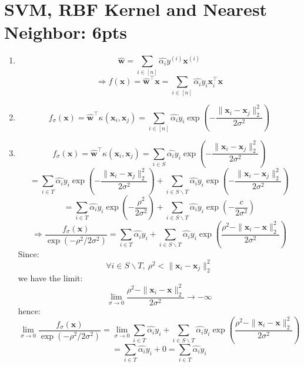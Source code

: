 \documentclass[12pt]{article}
\begin{document}
\section{SVM, RBF Kernel and Nearest Neighbor: 6pts}
\begin{enumerate}
    \item \[\hat{\boldsymbol{w}} = \sum_{i \in [n]} \hat{\alpha_i}y^{(i)}\boldsymbol{x}^{(i)}\]
    \[\Rightarrow f(\boldsymbol{x}) = \hat{\boldsymbol{w}}^{\top}\boldsymbol{x}
    = \sum_{i \in [n]} \hat{\alpha_i}y_i\boldsymbol{x}_i^{\top}\boldsymbol{x}\]
    \item \[f_\sigma(\boldsymbol{x}) = \hat{\boldsymbol{w}}^{\top}\kappa(\boldsymbol{x}_i, \boldsymbol{x}_j)
    = \sum_{i \in [n]} \hat{\alpha_i}y_i \exp \left( -\frac{\|\boldsymbol{x}_i - \boldsymbol{x}_j\|_2^2}{2\sigma^2} \right)\]
    \item \[f_\sigma(\boldsymbol{x}) = \hat{\boldsymbol{w}}^{\top}\kappa(\boldsymbol{x}_i, \boldsymbol{x}_j)
    = \sum_{i \in S} \hat{\alpha_i}y_i \exp \left( -\frac{\|\boldsymbol{x}_i - \boldsymbol{x}_j\|_2^2}{2\sigma^2} \right)\]
    \[= \sum_{i \in T} \hat{\alpha_i}y_i \exp \left( -\frac{\|\boldsymbol{x}_i - \boldsymbol{x}_j\|_2^2}{2\sigma^2} \right)
    + \sum_{i \in S\backslash T} \hat{\alpha_i}y_i \exp \left( -\frac{\|\boldsymbol{x}_i - \boldsymbol{x}_j\|_2^2}{2\sigma^2} \right)\]
    \[= \sum_{i \in T} \hat{\alpha_i}y_i \exp \left( -\frac{\rho^2}{2\sigma^2} \right)
    + \sum_{i \in S\backslash T} \hat{\alpha_i}y_i \exp \left( -\frac{c}{2\sigma^2} \right)\] 
    \[\Longrightarrow \frac{f_\sigma(\boldsymbol{x})}{\exp\left(-\rho^2/2\sigma^2\right)}
    = \sum_{i \in T} \hat{\alpha_i}y_i + \sum_{i \in S\backslash T} \hat{\alpha_i}y_i \exp \left(\frac{\rho^2 - \|\boldsymbol{x}_i - \boldsymbol{x}\|_2^2}{2\sigma^2} \right)\]
    Since:
    \[\forall i \in S\backslash T,\: \rho^2 < \|\boldsymbol{x}_i - \boldsymbol{x}_j\|_2^2\]
    we have the limit:
    \[\lim_{\sigma\rightarrow0}\frac{\rho^2 - \|\boldsymbol{x}_i - \boldsymbol{x}\|_2^2}{2\sigma^2}\rightarrow-\infty\]
    hence:
    \[\lim_{\sigma\rightarrow0} \frac{f_\sigma(\boldsymbol{x})}{\exp\left(-\rho^2/2\sigma^2\right)}
    = \lim_{\sigma\rightarrow0}
    \sum_{i \in T} \hat{\alpha_i}y_i + \sum_{i \in S\backslash T} \hat{\alpha_i}y_i \exp \left(\frac{\rho^2 - \|\boldsymbol{x}_i - \boldsymbol{x}\|_2^2}{2\sigma^2} \right)\] 
    \[= \sum_{i \in T} \hat{\alpha_i}y_i + 0 = \sum_{i \in T} \hat{\alpha_i}y_i\]
\end{enumerate}
\newpage
\end{document}
